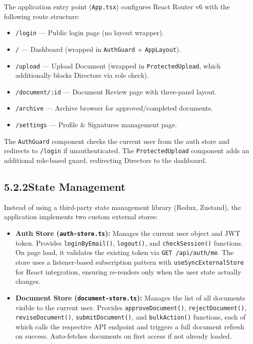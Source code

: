 \documentclass[12pt,a4paper]{report}
\begin{document}
The application entry point (\texttt{App.tsx}) configures React Router v6 with the following route structure:

\begin{itemize}
    \item \texttt{/login} --- Public login page (no layout wrapper).
    \item \texttt{/} --- Dashboard (wrapped in \texttt{AuthGuard} + \texttt{AppLayout}).
    \item \texttt{/upload} --- Upload Document (wrapped in \texttt{ProtectedUpload}, which additionally blocks Directors via role check).
    \item \texttt{/document/:id} --- Document Review page with three-panel layout.
    \item \texttt{/archive} --- Archive browser for approved/completed documents.
    \item \texttt{/settings} --- Profile \& Signatures management page.
\end{itemize}

The \texttt{AuthGuard} component checks the current user from the auth store and redirects to \texttt{/login} if unauthenticated. The \texttt{ProtectedUpload} component adds an additional role-based guard, redirecting Directors to the dashboard.

\subsection*{5.2.2\quad State Management}

Instead of using a third-party state management library (Redux, Zustand), the application implements two custom external stores:

\begin{itemize}
    \item \textbf{Auth Store (\texttt{auth-store.ts}):} Manages the current user object and JWT token. Provides \texttt{loginByEmail()}, \texttt{logout()}, and \texttt{checkSession()} functions. On page load, it validates the existing token via \texttt{GET /api/auth/me}. The store uses a listener-based subscription pattern with \texttt{useSyncExternalStore} for React integration, ensuring re-renders only when the user state actually changes.
    \item \textbf{Document Store (\texttt{document-store.ts}):} Manages the list of all documents visible to the current user. Provides \texttt{approveDocument()}, \texttt{rejectDocument()}, \texttt{reviseDocument()}, \texttt{submitDocument()}, and \texttt{bulkAction()} functions, each of which calls the respective API endpoint and triggers a full document refresh on success. Auto-fetches documents on first access if not already loaded.
\end{itemize}
\end{document}
